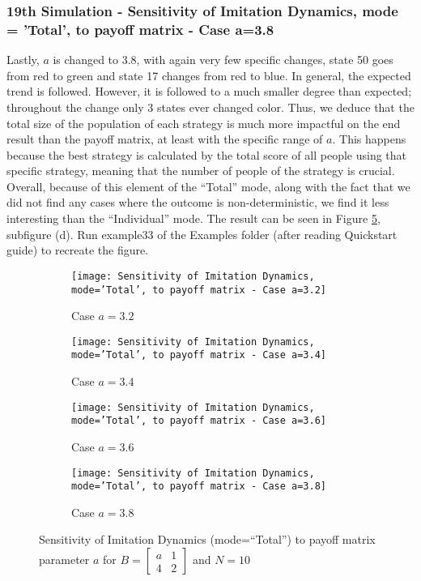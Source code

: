 \subsubsection{19th Simulation - Sensitivity of Imitation Dynamics, mode = 'Total', to payoff matrix - Case a=3.8}
Lastly, $a$ is changed to 3.8, with again very few specific changes, state 50 goes from red to green and state 17 changes from red to blue. In general, the expected trend is followed. However, it is followed to a much smaller degree than expected; throughout the change only 3 states ever changed color. Thus, we deduce that the total size of the population of each strategy is much more impactful on the end result than the payoff matrix, at least with the specific range of $a$. This happens because the best strategy is calculated by the total score of all people using that specific strategy, meaning that the number of people of the strategy is crucial. Overall, because of this element of the ``Total'' mode, along with the fact that we did not find any cases where the outcome is non-deterministic, we find it less interesting than the ``Individual'' mode. The result can be seen in Figure \ref{fig:Sensitivity of Imitation Dynamics, mode='Total', to payoff matrix}, subfigure (d). Run example33 of the Examples folder (after reading Quickstart guide) to recreate the figure.
	
	\begin{figure}[h]
		\centering
		\begin{subfigure}{.49\textwidth}
			\centering
			\texttt{[image: Sensitivity of Imitation Dynamics, mode='Total', to payoff matrix - Case a=3.2]}
			\caption{Case $a=3.2$}
			\label{fig:example30}
		\end{subfigure}
		\begin{subfigure}{.49\textwidth}
			\centering
			\texttt{[image: Sensitivity of Imitation Dynamics, mode='Total', to payoff matrix - Case a=3.4]}
			\caption{Case $a=3.4$}
			\label{fig:example31}
		\end{subfigure}
		\vspace{0.5em}
		\begin{subfigure}{.49\textwidth}
			\centering
			\texttt{[image: Sensitivity of Imitation Dynamics, mode='Total', to payoff matrix - Case a=3.6]}
			\caption{Case $a=3.6$}
			\label{fig:example32}
		\end{subfigure}
		\begin{subfigure}{.49\textwidth}
			\centering
			\texttt{[image: Sensitivity of Imitation Dynamics, mode='Total', to payoff matrix - Case a=3.8]}
			\caption{Case $a=3.8$}
			\label{fig:example33}
		\end{subfigure}
		\caption{Sensitivity of Imitation Dynamics (mode=``Total'') to payoff matrix parameter $a$ for $B = \begin{bmatrix} a & 1 \\ 4 & 2 \end{bmatrix}$ and $N=10$}
		\label{fig:Sensitivity of Imitation Dynamics, mode='Total', to payoff matrix}
	\end{figure}
